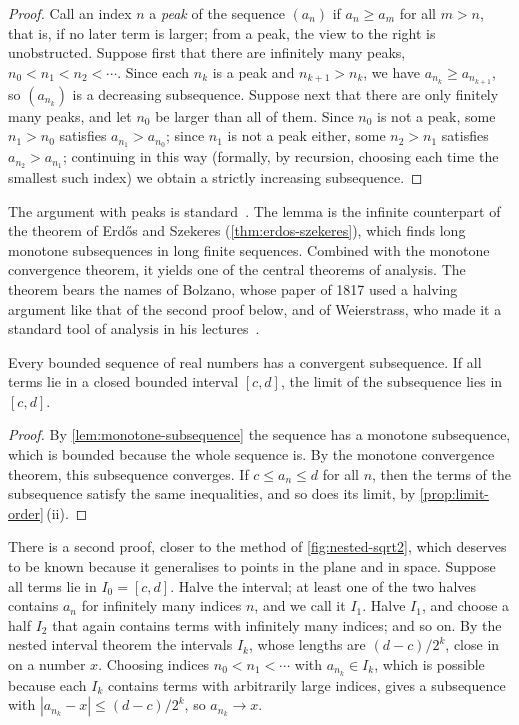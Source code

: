\begin{proof}
Call an index $n$ a \emph{peak} of the sequence $(a_n)$ if $a_n\ge a_m$ for all $m>n$, that is, if no later term is larger; from a peak, the view to the right is unobstructed. Suppose first that there are infinitely many peaks, $n_0<n_1<n_2<\cdots$. Since each $n_k$ is a peak and $n_{k+1}>n_k$, we have $a_{n_k}\ge a_{n_{k+1}}$, so $(a_{n_k})$ is a decreasing subsequence. Suppose next that there are only finitely many peaks, and let $n_0$ be larger than all of them. Since $n_0$ is not a peak, some $n_1>n_0$ satisfies $a_{n_1}>a_{n_0}$; since $n_1$ is not a peak either, some $n_2>n_1$ satisfies $a_{n_2}>a_{n_1}$; continuing in this way (formally, by recursion, choosing each time the smallest such index) we obtain a strictly increasing subsequence.
\end{proof}

The argument with peaks is standard~\cite{bartle2011}. The lemma is the infinite counterpart of the theorem of Erd\H{o}s and Szekeres (\cref{thm:erdos-szekeres}), which finds long monotone subsequences in long finite sequences. Combined with the monotone convergence theorem, it yields one of the central theorems of analysis. The theorem bears the names of Bolzano, whose paper of 1817 used a halving argument like that of the second proof below, and of Weierstrass, who made it a standard tool of analysis in his lectures~\cite{russ1980,hairer1996analysis}.

\begin{theorem}
\label{thm:bolzano-weierstrass}
Every bounded sequence of real numbers has a convergent subsequence. If all terms lie in a closed bounded interval $[c,d]$, the limit of the subsequence lies in $[c,d]$.
\end{theorem}

\begin{proof}
By \cref{lem:monotone-subsequence} the sequence has a monotone subsequence, which is bounded because the whole sequence is. By the monotone convergence theorem, this subsequence converges. If $c\le a_n\le d$ for all $n$, then the terms of the subsequence satisfy the same inequalities, and so does its limit, by \cref{prop:limit-order}\,(ii).
\end{proof}

There is a second proof, closer to the method of \cref{fig:nested-sqrt2}, which deserves to be known because it generalises to points in the plane and in space. Suppose all terms lie in $I_0=[c,d]$. Halve the interval; at least one of the two halves contains $a_n$ for infinitely many indices $n$, and we call it $I_1$. Halve $I_1$, and choose a half $I_2$ that again contains terms with infinitely many indices; and so on. By the nested interval theorem the intervals $I_k$, whose lengths are $(d-c)/2^k$, close in on a number $x$. Choosing indices $n_0<n_1<\cdots$ with $a_{n_k}\in I_k$, which is possible because each $I_k$ contains terms with arbitrarily large indices, gives a subsequence with $|a_{n_k}-x|\le(d-c)/2^k$, so $a_{n_k}\to x$.

